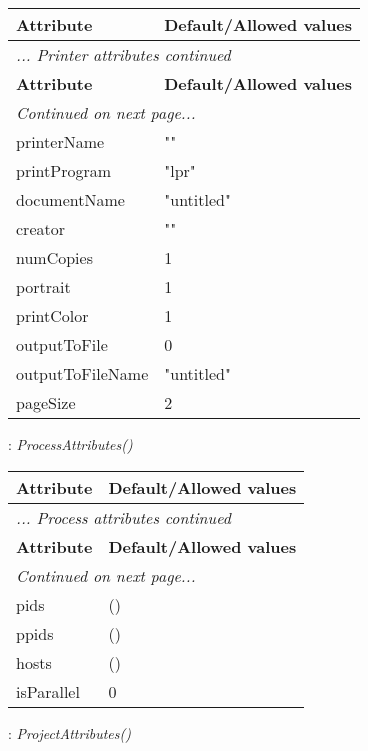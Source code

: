 \documentclass[10pt,a4paper]{report}
\begin{document}
\begin{longtable}{ll}
{\bf Attribute} & {\bf Default/Allowed values} \\
\hline \hline
\endfirsthead
\multicolumn{2}{l}{{\it ... Printer attributes continued}} \\
{\bf Attribute} & {\bf Default/Allowed values} \\
\hline \hline
\endhead
\hline
\multicolumn{2}{l}{{\it Continued on next page...}} \\
\endfoot
\hline
\endlastfoot

printerName  &  "" \\
printProgram  &  "lpr" \\
documentName  &  "untitled" \\
creator  &  "" \\
numCopies  &  1 \\
portrait  &  1 \\
printColor  &  1 \\
outputToFile  &  0 \\
outputToFileName  &  "untitled" \\
pageSize  &  2 \\
\end{longtable}

\newpage

{}
: {\it ProcessAttributes() }\\[-3mm]

\begin{longtable}{ll}
{\bf Attribute} & {\bf Default/Allowed values} \\
\hline \hline
\endfirsthead
\multicolumn{2}{l}{{\it ... Process attributes continued}} \\
{\bf Attribute} & {\bf Default/Allowed values} \\
\hline \hline
\endhead
\hline
\multicolumn{2}{l}{{\it Continued on next page...}} \\
\endfoot
\hline
\endlastfoot

pids  &  () \\
ppids  &  () \\
hosts  &  () \\
isParallel  &  0 \\
\end{longtable}

\newpage

{}
: {\it ProjectAttributes() }\\[-3mm]
\end{document}
